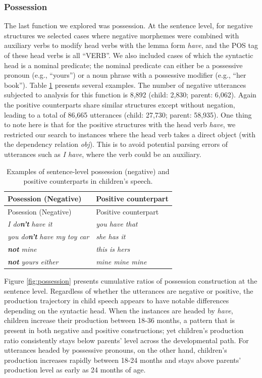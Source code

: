\documentclass[
  man,floatsintext]{apa6}
\begin{document}
\subsubsection{Possession}\label{possession}

The last function we explored was possession. At the sentence level, for negative structures we selected cases where negative morphemes were combined with auxiliary verbs to modify head verbs with the lemma form \emph{have}, and the POS tag of these head verbs is all ``VERB''. We also included cases of which the syntactic head is a nominal predicate; the nominal predicate can either be a possessive pronoun (e.g., ``yours'') or a noun phrase with a possessive modifier (e.g., ``her book''). Table \ref{tab:possess} presents several examples. The number of negative utterances subjected to analysis for this function is 8,892 (child: 2,830; parent: 6,062). Again the positive counterparts share similar structures except without negation, leading to a total of 86,665 utterances (child: 27,730; parent: 58,935). One thing to note here is that for the positive structures with the head verb \emph{have}, we restricted our search to instances where the head verb takes a direct object (with the dependency relation \emph{obj}). This is to avoid potential parsing errors of utterances such as \emph{I have}, where the verb could be an auxiliary.

\begin{longtable}[]{@{}ll@{}}
\caption{\label{tab:possess} Examples of sentence-level possession (negative) and positive counterparts in children's speech.}\tabularnewline
\toprule\noalign{}
Posession (Negative) & Positive counterpart \\
\midrule\noalign{}
\endfirsthead
\toprule\noalign{}
Posession (Negative) & Positive counterpart \\
\midrule\noalign{}
\endhead
\bottomrule\noalign{}
\endlastfoot
\emph{I do\textbf{n't}} \emph{have it} & \emph{you have that} \\
\emph{you do\textbf{n't}} \emph{have my toy car} & \emph{she has it} \\
\textbf{\emph{not}} \emph{mine} & \emph{this is hers} \\
\textbf{\emph{not}} \emph{yours either} & \emph{mine mine mine} \\
\end{longtable}

Figure \ref{fig:possession} presents cumulative ratios of possession construction at the sentence level. Regardless of whether the utterances are negative or positive, the production trajectory in child speech appears to have notable differences depending on the syntactic head. When the instances are headed by \emph{have}, children increase their production between 18-36 months, a pattern that is present in both negative and positive constructions; yet children's production ratio consistently stays below parents' level across the developmental path. For utterances headed by possessive pronouns, on the other hand, children's production increases rapidly between 18-24 months and stays above parents' production level as early as 24 months of age.
\end{document}
